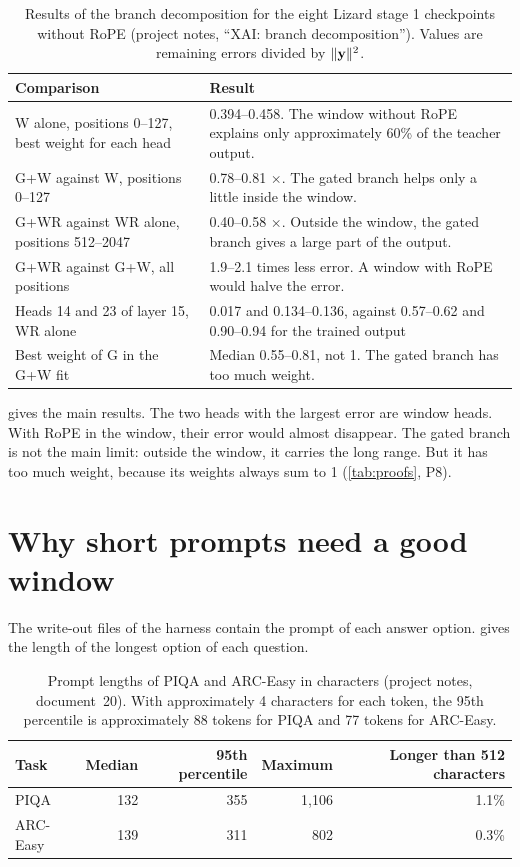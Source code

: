 \begin{table}[ht]
\centering
\small
\caption[Results of the branch decomposition]{Results of the branch decomposition for the eight Lizard stage 1 checkpoints without RoPE (project notes, \enquote{XAI: branch decomposition}). Values are remaining errors divided by $\|\vy\|^2$.}
\label{tab:branch-fit}
\begin{tabularx}{\linewidth}{@{}LL@{}}
\toprule
Comparison & Result \\
\midrule
W alone, positions 0--127, best weight for each head & 0.394--0.458. The window without RoPE explains only approximately 60\% of the teacher output. \\
G+W against W, positions 0--127 & 0.78--0.81 $\times$. The gated branch helps only a little inside the window. \\
G+WR against WR alone, positions 512--2047 & 0.40--0.58 $\times$. Outside the window, the gated branch gives a large part of the output. \\
G+WR against G+W, all positions & 1.9--2.1 times less error. A window with RoPE would halve the error. \\
Heads 14 and 23 of layer 15, WR alone & 0.017 and 0.134--0.136, against 0.57--0.62 and 0.90--0.94 for the trained output \\
Best weight of G in the G+W fit & Median 0.55--0.81, not 1. The gated branch has too much weight. \\
\bottomrule
\end{tabularx}
\end{table}

 gives the main results. The two heads with the largest error are window heads. With RoPE in the window, their error would almost disappear. The gated branch is not the main limit: outside the window, it carries the long range. But it has too much weight, because its weights always sum to 1 (\cref{tab:proofs}, P8).

\section{Why short prompts need a good window}
\label{sec:short-prompts}

The write-out files of the harness contain the prompt of each answer option.  gives the length of the longest option of each question.

\begin{table}[ht]
\centering
\small
\caption[Prompt lengths of PIQA and ARC-Easy]{Prompt lengths of PIQA and ARC-Easy in characters (project notes, document~20). With approximately 4 characters for each token, the 95th percentile is approximately 88 tokens for PIQA and 77 tokens for ARC-Easy.}
\label{tab:prompt-length}
\begin{tabular}{@{}lrrrr@{}}
\toprule
Task & Median & 95th percentile & Maximum & Longer than 512 characters \\
\midrule
PIQA & 132 & 355 & 1,106 & 1.1\% \\
ARC-Easy & 139 & 311 & 802 & 0.3\% \\
\bottomrule
\end{tabular}
\end{table}

